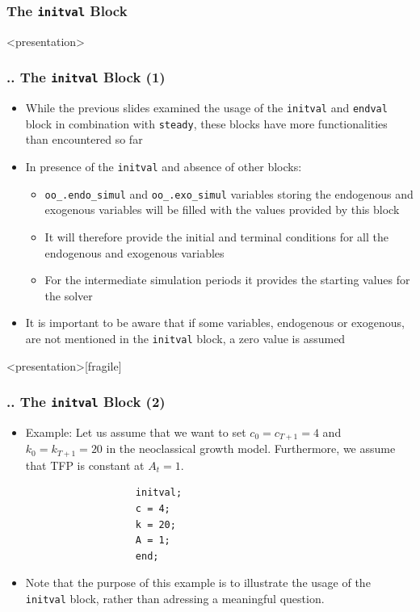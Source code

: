 \documentclass[11pt,aspectratio=169]{beamer}
\begin{document}
\subsubsection{The \texttt{initval} Block}
\begin{frame}<presentation>
	\frametitle{{\thesection.\thesubsection.\thesubsubsection} The \texttt{initval} Block (1)}
	\begin{itemize}
		\item While the previous slides examined the usage of the \texttt{initval} and \texttt{endval} block in combination with \texttt{steady}, these blocks have more functionalities than encountered so far
		\item In presence of the \texttt{initval} and absence of other blocks:
		\begin{itemize}
			\item \texttt{oo\_.endo\_simul} and \texttt{oo\_.exo\_simul} variables storing the endogenous and exogenous variables will be filled with the values provided by this block
			\item It will therefore provide the initial and terminal conditions for all the endogenous and exogenous variables
			\item For the intermediate simulation periods it provides the starting values for the solver 
		\end{itemize} 
		\item It is important to be aware that if some variables, endogenous or exogenous, are not mentioned in the \texttt{initval} block, a zero value is assumed
	\end{itemize}
\end{frame}
\begin{frame}<presentation>[fragile]
	\frametitle{{\thesection.\thesubsection.\thesubsubsection} The \texttt{initval} Block (2)}
	\begin{itemize}
		\item Example: Let us assume that we want to set $c_0=c_{T+1}=4$ and $k_0=k_{T+1}=20$ in the neoclassical growth model. Furthermore, we assume that TFP is constant at $A_t=1$.
			\begin{verbatim}
				   initval;
				   c = 4;
				   k = 20;
				   A = 1;
				   end;
			\end{verbatim}
		\item Note that the purpose of this example is to illustrate the usage of the \texttt{initval} block, rather than adressing a meaningful question.
	\end{itemize}
\end{frame}
\end{document}
